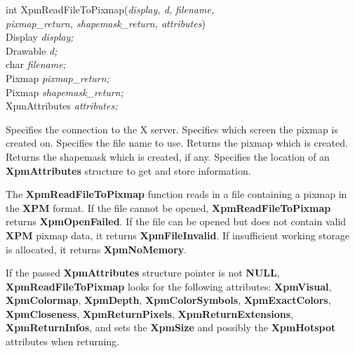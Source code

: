\begin{flushleft} 

int XpmReadFileToPixmap({\it display, d, filename, \\
\hspace{3cm}pixmap\_return, shapemask\_return, attributes})\\

\hspace{1cm}Display {\it *display;}\\
\hspace{1cm}Drawable {\it d;}\\
\hspace{1cm}char {\it *filename;}\\
\hspace{1cm}Pixmap {\it *pixmap\_return;}\\
\hspace{1cm}Pixmap {\it *shapemask\_return;}\\
\hspace{1cm}XpmAttributes {\it *attributes;}

\end{flushleft}

\begin{description}

 Specifies the connection to the X server.
 Specifies which screen the pixmap is created on.
 Specifies the file name to use.
 Returns the pixmap which is created.
 Returns the shapemask which is created, if any.
 Specifies the location of an {\bf XpmAttributes} structure
to get and store information.

\end{description} 

The {\bf XpmReadFileToPixmap} function reads in a file containing a pixmap in
the {\bf XPM} format. If the file cannot be opened, {\bf XpmReadFileToPixmap}
returns {\bf XpmOpenFailed}. If the file can be opened but does not
contain valid {\bf XPM} pixmap data, it returns {\bf XpmFileInvalid}. If
insufficient working storage is allocated, it returns {\bf XpmNoMemory}.

If the passed {\bf XpmAttributes} structure pointer is not {\bf NULL}, {\bf
XpmReadFileToPixmap} looks for the following attributes: {\bf XpmVisual}, {\bf
XpmColormap}, {\bf XpmDepth}, {\bf XpmColorSymbols}, {\bf XpmExactColors},
{\bf XpmCloseness}, {\bf XpmReturnPixels}, {\bf XpmReturnExtensions},
{\bf XpmReturnInfos}, and sets the {\bf XpmSize} and possibly the
{\bf XpmHotspot} attributes when returning.

